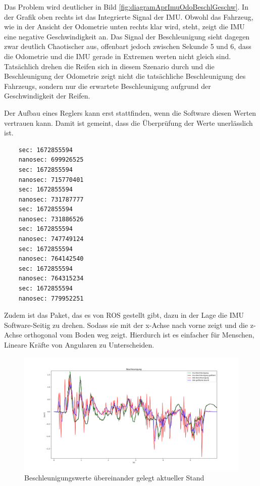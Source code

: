 Das Problem wird deutlicher in Bild \ref{fig:diagramAprImuOdoBeschlGeschw}. In der Grafik oben rechts ist das Integrierte Signal der IMU. Obwohl das Fahrzeug, wie in der Ansicht der Odometrie unten rechts klar wird, steht, zeigt die IMU eine negative Geschwindigkeit an. Das Signal der Beschleunigung sieht dagegen zwar deutlich Chaotischer aus, offenbart jedoch zwischen Sekunde 5 und 6, dass die Odometrie und die IMU gerade in Extremen werten nicht gleich sind. Tatsächlich drehen die Reifen sich in diesem Szenario durch und die Beschleunigung der Odometrie zeigt nicht die tatsächliche Beschleunigung des Fahrzeugs, sondern nur die erwartete Beschleunigung aufgrund der Geschwindigkeit der Reifen. 

Der Aufbau eines Reglers kann erst stattfinden, wenn die Software diesen Werten vertrauen kann. Damit ist gemeint, dass die Überprüfung der Werte unerlässlich ist. 

\begin{lstlisting}
    sec: 1672855594
    nanosec: 699926525
    sec: 1672855594
    nanosec: 715770401
    sec: 1672855594
    nanosec: 731787777
    sec: 1672855594
    nanosec: 731886526
    sec: 1672855594
    nanosec: 747749124
    sec: 1672855594
    nanosec: 764142540
    sec: 1672855594
    nanosec: 764315234
    sec: 1672855594
    nanosec: 779952251
\end{lstlisting}

Zudem ist das  Paket, das es von ROS gestellt gibt, dazu in der Lage die IMU Software-Seitig zu drehen. Sodass sie mit der x-Achse nach vorne zeigt und die z-Achse orthogonal vom Boden weg zeigt. Hierdurch ist es einfacher für Menschen, Lineare Kräfte von Angularen zu Unterscheiden.

\begin{figure}
    \centering
    \hspace*{-2cm}\includegraphics[width=1.2\textwidth]{bilder/23AprBeschlOverlap.png}
    \caption{Beschleunigungswerte übereinander gelegt aktueller Stand}
    \label{fig:diagramApeBeschlOverlap}
\end{figure}


